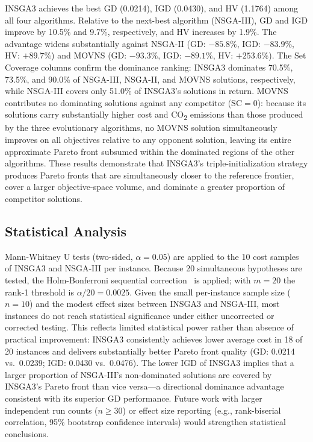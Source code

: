 \documentclass[11pt, a4paper]{article}
\numberwithin{equation}{section}
\begin{document}
INSGA3 achieves the best GD (0.0214), IGD (0.0430), and HV (1.1764) among all
four algorithms.  Relative to the next-best algorithm (NSGA-III), GD and IGD
improve by 10.5\% and 9.7\%, respectively, and HV increases by 1.9\%.
The advantage widens substantially against NSGA-II (GD: $-85.8\%$, IGD:
$-83.9\%$, HV: $+89.7\%$) and MOVNS (GD: $-93.3\%$, IGD: $-89.1\%$, HV:
$+253.6\%$).  The Set Coverage columns confirm the dominance ranking:
INSGA3 dominates 70.5\%, 73.5\%, and 90.0\% of NSGA-III, NSGA-II, and MOVNS
solutions, respectively, while NSGA-III covers only 51.0\% of INSGA3's
solutions in return.  MOVNS contributes no dominating solutions against any
competitor ($\mathrm{SC}=0$): because its solutions carry substantially higher
cost and CO\textsubscript{2} emissions than those produced by the three
evolutionary algorithms, no MOVNS solution simultaneously improves on all
objectives relative to any opponent solution, leaving its entire approximate
Pareto front subsumed within the dominated regions of the other algorithms.
These results demonstrate that INSGA3's triple-initialization strategy produces
Pareto fronts that are simultaneously closer to the reference frontier, cover a
larger objective-space volume, and dominate a greater proportion of competitor
solutions.

\subsection{Statistical Analysis}

Mann-Whitney U tests (two-sided, $\alpha=0.05$) are applied to the 10 cost
samples of INSGA3 and NSGA-III per instance.  Because 20 simultaneous
hypotheses are tested, the Holm-Bonferroni sequential
correction~\cite{holm1979} is applied; with $m=20$ the rank-1 threshold is
$\alpha/20=0.0025$.  Given the small per-instance sample size ($n=10$) and
the modest effect sizes between INSGA3 and NSGA-III, most instances do not
reach statistical significance under either uncorrected or corrected testing.
This reflects limited statistical power rather than absence of practical
improvement: INSGA3 consistently achieves lower average cost in 18 of 20
instances and delivers substantially better Pareto front quality (GD: 0.0214
vs.\ 0.0239; IGD: 0.0430 vs.\ 0.0476).  The lower IGD of INSGA3 implies
that a larger proportion of NSGA-III's non-dominated solutions are covered
by INSGA3's Pareto front than vice versa---a directional dominance advantage
consistent with its superior GD performance.  Future work with larger
independent run counts ($n \geq 30$) or effect size reporting (e.g.,
rank-biserial correlation, 95\% bootstrap confidence intervals) would
strengthen statistical conclusions.
\end{document}
